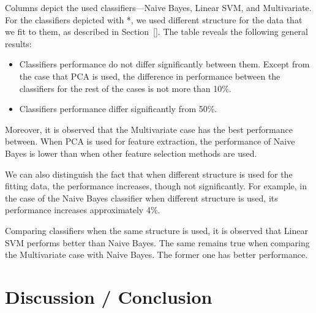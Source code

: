 \documentclass[preprint,journal,11pt]{vgtc}
\begin{document}
Columns depict the used classifiers---Naive Bayes, Linear SVM, and Multivariate. For the classifiers depicted with *, we used different structure for the data that we fit to them, as described in Section~\ref{}. The table reveals the following general results:

\begin{itemize}
	\item Classifiers performance do not differ significantly between them. Except from the case that PCA is used, the difference in performance between the classifiers for the rest of the cases is not more than 10\%.
	\item Classifiers performance differ significantly from 50\%.
\end{itemize}

Moreover, it is observed that the Multivariate case has the best performance between. When PCA is used for feature extraction, the performance of Naive Bayes is lower than when other feature selection methods are used. 

We can also distinguish the fact that when different structure is used for the fitting data, the performance increases, though not significantly. For example, in the case of the Naive Bayes classifier when different structure is used, its performance increases approximately 4\%.

Comparing classifiers when the same structure is used, it is observed that Linear SVM performs better than Naive Bayes. The same remains true when comparing the Multivariate case with Naive Bayes. The former one has better performance.



\section{Discussion / Conclusion}
\label{sec:discussion}


\nocite{*}

\end{document}
